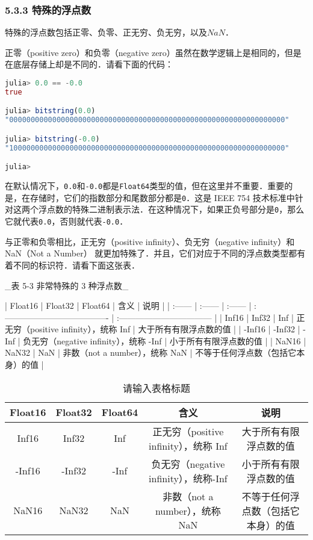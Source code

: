 \subsubsection{5.3.3 特殊的浮点数}

特殊的浮点数包括正零、负零、正无穷、负无穷，以及$NaN$．

正零（positive zero）和负零（negative zero）虽然在数学逻辑上是相同的，但是在底层存储上却是不同的．请看下面的代码：
\begin{lstlisting}[language=julia]
julia> 0.0 == -0.0 
true

julia> bitstring(0.0)
"0000000000000000000000000000000000000000000000000000000000000000"

julia> bitstring(-0.0)
"1000000000000000000000000000000000000000000000000000000000000000"

julia> 
\end{lstlisting}

在默认情况下，\verb|0.0|和\verb|-0.0|都是\verb|Float64|类型的值，但在这里并不重要．重要的是，在存储时，它们的指数部分和尾数部分都是\verb|0|．这是 IEEE 754 技术标准中针对这两个浮点数的特殊二进制表示法．在这种情况下，如果正负号部分是\verb|0|，那么它就代表\verb|0.0|，否则就代表\verb|-0.0|．

与正零和负零相比，正无穷（positive infinity）、负无穷（negative infinity）和 NaN（Not a Number） 就更加特殊了．并且，它们对应于不同的浮点数类型都有着不同的标识符．请看下面这张表．

_表 5-3 非常特殊的 3 种浮点数_

| Float16 | Float32 | Float64 | 含义                                   | 说明                               |
| :------ | :------ | :------ | :------------------------------------- | :--------------------------------- |
| Inf16   | Inf32   | Inf     | 正无穷（positive infinity），统称 Inf  | 大于所有有限浮点数的值             |
| -Inf16  | -Inf32  | -Inf    | 负无穷（negative infinity），统称 -Inf | 小于所有有限浮点数的值             |
| NaN16   | NaN32   | NaN     | 非数（not a number），统称 NaN         | 不等于任何浮点数（包括它本身）的值 |

\begin{table}[ht]
\centering
\caption{请输入表格标题}\label{JuC5S3_tab2}
\begin{tabular}{|c|c|c|c|c|}
\hline
Float16 & Float32 & Float64 & 含义 & 说明 \\
\hline
Inf16 & Inf32 & Inf & 正无穷（positive infinity），统称 Inf&大于所有有限浮点数的值 \\
\hline
-Inf16 & -Inf32 & -Inf & 负无穷（negative infinity），统称-Inf & 小于所有有限浮点数的值 \\
\hline
NaN16 & NaN32 & NaN & 非数（not a number），统称 NaN & 不等于任何浮点数（包括它本身）的值
\hline
\end{tabular}
\end{table}


